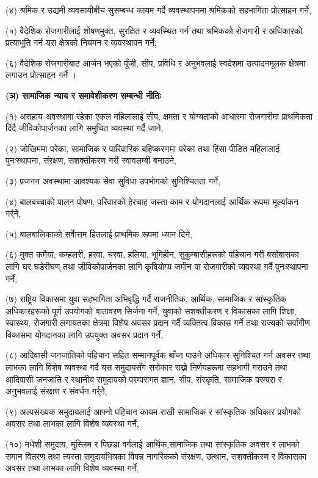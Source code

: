 (४) श्रमिक र उद्यमी व्यवसायीबीच सुसम्बन्ध कायम गर्दैै व्यवस्थापनमा श्रमिकको सहभागिता प्रोत्साहन गर्ने,

(५) वैदेशिक रोजगारीलाई शोषणमुक्त, सुरक्षित र व्यवस्थित गर्न तथा श्रमिकको रोजगारी र अधिकारको प्रत्याभूति गर्न यस क्षेत्रको नियमन र व्यवस्थापन गर्ने,

(६) वैदेशिक रोजगारीबाट आर्जन भएको पूँजी, सीप, प्रविधि र अनुभवलाई स्वदेशमा उत्पादनमूलक क्षेत्रमा लगाउन
प्रोत्साहन गर्ने ।

\textbf{(ञ) सामाजिक न्याय र समावेशीकरण सम्बन्धी नीतिः}

(१) असहाय अवस्थामा रहेका एकल महिलालाई सीप, क्षमता र योग्यताको आधारमा रोजगारीमा प्राथमिकता दिंदै जीविकोपार्जनका लागि समुचित व्यवस्था गर्दै जाने,

(२) जोखिममा परेका, सामाजिक र पारिवारिक बहिष्करणमा परेका तथा हिंसा पीडित महिलालाई पुनःस्थापना, संरक्षण, सशक्तीकरण गरी स्वावलम्बी बनाउने,

(३) प्रजनन अवस्थामा आवश्यक सेवा सुविधा उपभोगको सुनिश्चितता गर्ने,

(४) बालबच्चाको पालन पोषण, परिवारको हेरचाह जस्ता काम र योगदानलाई आर्थिक रूपमा मूल्यांकन गर्र्नेे,

(५) बालबालिकाको सर्वाेत्तम हितलाई प्राथमिक रूपमा ध्यान दिने,

(६) मुक्त कमैया, कम्हलरी, हरवा, चरवा, हलिया, भूमिहीन, सुकुम्बासीहरूको पहिचान गरी बसोबासका लागि घर घडेरीघण् तथा जीविकोपार्जनका लागि कृषियोग्य जमीन वा रोजगारीको व्यवस्था गर्दै पुनःस्थापना गर्ने,

(७) राष्ट्रिय विकासमा युवा सहभागिता अभिवृद्धि गर्दै राजनीतिक, आर्थिक, सामाजिक र सांस्कृतिक अधिकारहरूको पूर्ण उपयोगको वातावरण सिर्जना गर्ने, युवाको सशक्तीकरण र विकासका लागि शिक्षा, स्वास्थ्य, रोजगारी लगायतका क्षेत्रमा विशेष अवसर प्रदान गर्दै व्यक्तित्व विकास गर्ने तथा राज्यको सर्वांगीण विकासमा योगदानका लागि उपयुक्त अवसर प्रदान गर्ने,

(८) आदिवासी जनजातिको पहिचान सहित सम्मानपूर्वक बाँच्न पाउने अधिकार सुनिश्चित गर्न अवसर तथा लाभका लागि विशेष व्यवस्था गर्दै यस समुदायसँग सरोकार राख्ने निर्णयहरूमा सहभागी गराउने तथा आदिवासी जनजाति र स्थानीय समुदायको परम्परागत ज्ञान, सीप, संस्कृति, सामाजिक परम्परा र अनुभवलाई संरक्षण र संवर्धन गर्र्नेे,

(९) अल्पसंख्यक समुदायलाई आफ्नो पहिचान कायम राखी सामाजिक र सांस्कृतिक अधिकार प्रयोगको अवसर तथा लाभका लागि विशेष व्यवस्था गर्ने,

(१०) मधेशी समुदाय, मुस्लिम र पिछडा वर्गलाई आर्थिक,सामाजिक तथा सांस्कृतिक अवसर र लाभको समान वितरण तथा त्यस्ता समुदायभित्रका विपन्न नागरिकको संरक्षण, उत्थान, सशक्तीकरण र विकासका अवसर तथा लाभका लागि विशेष व्यवस्था गर्ने,

